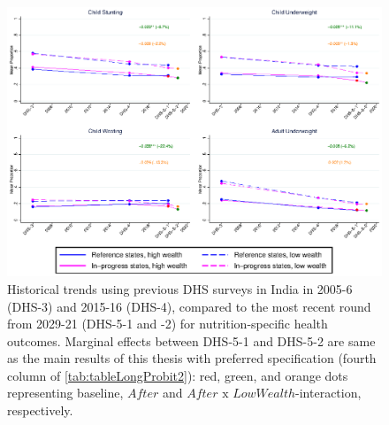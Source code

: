 \documentclass[12pt,a4paper,notitlepage]{article}
\begin{document}
\begin{figure}
\includegraphics[width=1\linewidth]{images/meanGraphs2.eps}
\caption{\label{fig:meanGraphs2} Historical trends using previous DHS surveys in India in 2005-6 (DHS-3) and 2015-16 (DHS-4), compared to the most recent round from 2029-21 (DHS-5-1 and -2) for nutrition-specific health outcomes. Marginal effects between DHS-5-1 and DHS-5-2 are same as the main results of this thesis with preferred specification (fourth column of \cref{tab:tableLongProbit2}): red, green, and orange dots representing baseline, $After$ and $After\text{ x }LowWealth$-interaction, respectively.}
\end{figure}
\end{document}

